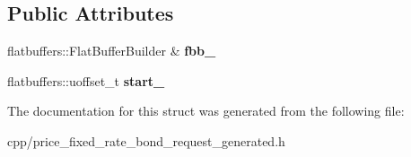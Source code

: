 \subsection*{Public Attributes}
\begin{DoxyCompactItemize}
\item 
\mbox{\label{structquantra_1_1PriceFixedRateBondBuilder_a235183bfe8526f78ee7298ec4caa89aa}} 
flatbuffers\+::\+Flat\+Buffer\+Builder \& {\bfseries fbb\+\_\+}
\item 
\mbox{\label{structquantra_1_1PriceFixedRateBondBuilder_a212ed6362c31b8e7e43e2b1df04af3f5}} 
flatbuffers\+::uoffset\+\_\+t {\bfseries start\+\_\+}
\end{DoxyCompactItemize}


The documentation for this struct was generated from the following file\+:\begin{DoxyCompactItemize}
\item 
cpp/price\+\_\+fixed\+\_\+rate\+\_\+bond\+\_\+request\+\_\+generated.\+h\end{DoxyCompactItemize}
